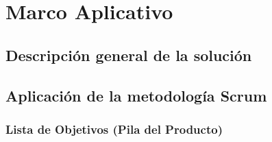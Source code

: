 \chapter{Marco Aplicativo}


\section{Descripción general de la solución} 
\setlength{\parskip}{5mm}
\setlength{\parskip}{0mm}


\section{Aplicación de la metodología Scrum}

\subsection{Lista de Objetivos (Pila del Producto)}



